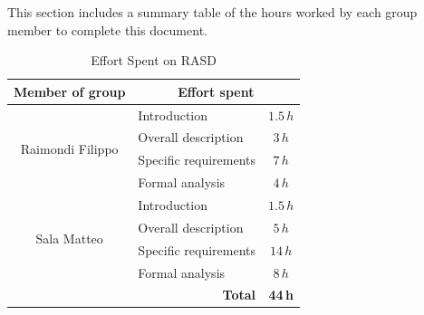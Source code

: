 This section includes a summary table of the hours worked by each group member to complete this document.

\begin{table}[h!]
\centering
\begin{tabular}{c|l|c}
\hline
Member of group & \multicolumn{2}{c}{Effort spent} \\
\hline
\multirow{4}{*}{Raimondi Filippo} 
 & Introduction & $1.5\,h$ \\
 & Overall description & $3\,h$ \\
 & Specific requirements & $7\,h$ \\
 & Formal analysis & $4\,h$ \\
\hline
\multirow{4}{*}{Sala Matteo} 
 & Introduction & $1.5\,h$ \\
 & Overall description & $5\,h$ \\
 & Specific requirements & $14\,h$ \\
 & Formal analysis & $8\,h$ \\
\hline
\multicolumn{2}{r|}{\textbf{Total}} & \textbf{44\,h} \\
\hline
\end{tabular}
\caption{Effort Spent on RASD}
\end{table}